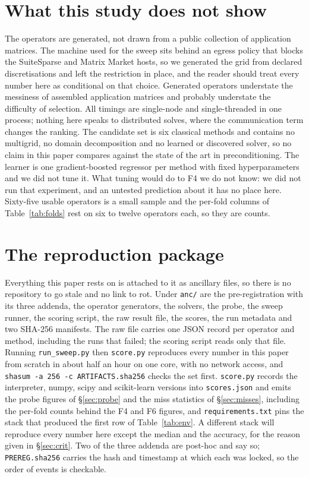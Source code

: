 \documentclass[11pt]{article}
\begin{document}
\section{What this study does not show}

The operators are generated, not drawn from a public collection of application
matrices. The machine used for the sweep sits behind an egress policy that blocks
the SuiteSparse and Matrix Market hosts, so we generated the grid from declared
discretisations and left the restriction in place, and the reader should
treat every number here as conditional on that choice. Generated operators
understate the messiness of assembled application matrices and probably
understate the difficulty of selection. All timings are single-node and
single-threaded in one process; nothing here speaks to distributed solves, where
the communication term changes the ranking. The candidate set is six classical
methods and contains no multigrid, no domain decomposition and no learned or
discovered solver, so no claim in this paper compares against the state of the
art in preconditioning. The learner is one gradient-boosted regressor per method
with fixed hyperparameters and we did not tune it. What tuning would do to F4 we do not
know: we did not run that experiment, and an untested prediction about it has no place
here. Sixty-five usable operators is a small sample and
the per-fold columns of Table~\ref{tab:folds} rest on six to twelve operators
each, so they are counts.

\section{The reproduction package}

Everything this paper rests on is attached to it as ancillary files, so there is no
repository to go stale and no link to rot. Under \texttt{anc/} are the
pre-registration with its three addenda, the operator generators, the solvers, the probe,
the sweep runner, the scoring script, the raw result file, the scores, the run metadata and
two SHA-256 manifests. The raw file carries one JSON record per operator and method,
including the runs that failed; the scoring script reads only that file. Running
\texttt{run\_sweep.py} then \texttt{score.py} reproduces every number in this paper from
scratch in about half an hour on one core, with no network access, and
\texttt{shasum -a 256 -c ARTIFACTS.sha256} checks the set first. \texttt{score.py} records
the interpreter, numpy, scipy and scikit-learn versions into \texttt{scores.json} and emits
the probe figures of \S\ref{sec:probe} and the miss statistics of \S\ref{sec:misses},
including the per-fold counts behind the F4 and F6 figures, and \texttt{requirements.txt} pins the stack that
produced the first row of Table~\ref{tab:env}. A different stack will reproduce every
number here except the median and the accuracy, for the reason given in \S\ref{sec:crit}. Two of the three addenda
are post-hoc and say so; \texttt{PREREG.sha256} carries the hash and timestamp at which
each was locked, so the order of events is checkable.
\end{document}
